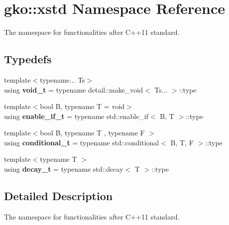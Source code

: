 \hypertarget{namespacegko_1_1xstd}{}\section{gko\+:\+:xstd Namespace Reference}
\label{namespacegko_1_1xstd}


The namespace for functionalities after C++11 standard.  


\subsection*{Typedefs}
\begin{DoxyCompactItemize}
\item 
\mbox{\label{namespacegko_1_1xstd_a185b5a0964814a042089d2a6b994d8e9}} 
{\footnotesize template$<$typename... Ts$>$ }\\using {\bfseries void\+\_\+t} = typename detail\+::make\+\_\+void$<$ Ts... $>$\+::type
\item 
\mbox{\label{namespacegko_1_1xstd_a77a8d29b686548e0d6ae0af42db8987e}} 
{\footnotesize template$<$bool B, typename T  = void$>$ }\\using {\bfseries enable\+\_\+if\+\_\+t} = typename std\+::enable\+\_\+if$<$ B, T $>$\+::type
\item 
\mbox{\label{namespacegko_1_1xstd_a24a624e1b4136f6766e028fc7e211469}} 
{\footnotesize template$<$bool B, typename T , typename F $>$ }\\using {\bfseries conditional\+\_\+t} = typename std\+::conditional$<$ B, T, F $>$\+::type
\item 
\mbox{\label{namespacegko_1_1xstd_ae8af2095a8c816557f201ecedfa50600}} 
{\footnotesize template$<$typename T $>$ }\\using {\bfseries decay\+\_\+t} = typename std\+::decay$<$ T $>$\+::type
\end{DoxyCompactItemize}


\subsection{Detailed Description}
The namespace for functionalities after C++11 standard. 